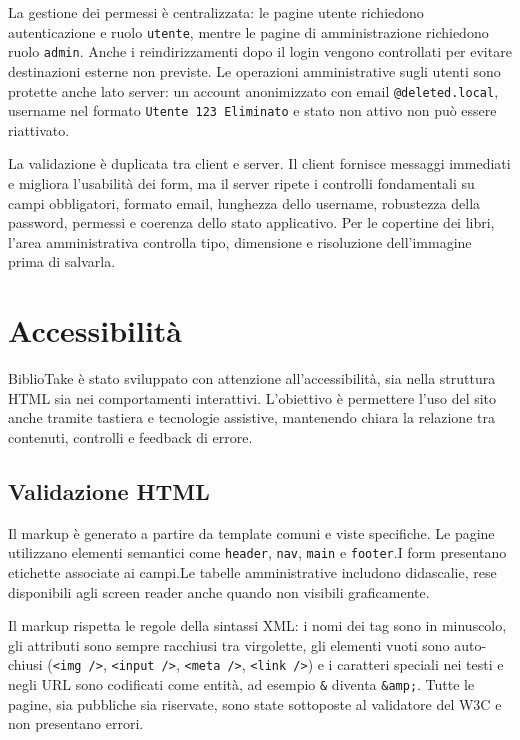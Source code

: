﻿\documentclass{article}
\newcommand{\nomeprogetto}{BiblioTake}
\begin{document}
La gestione dei permessi è centralizzata: le pagine utente richiedono autenticazione e ruolo \texttt{utente}, mentre le pagine di amministrazione richiedono ruolo \texttt{admin}. Anche i reindirizzamenti dopo il login vengono controllati per evitare destinazioni esterne non previste. Le operazioni amministrative sugli utenti sono protette anche lato server: un account anonimizzato con email \texttt{@deleted.local}, username nel formato \texttt{Utente 123 Eliminato} e stato non attivo non può essere riattivato.

La validazione è duplicata tra client e server. Il client fornisce messaggi immediati e migliora l'usabilità dei form, ma il server ripete i controlli fondamentali su campi obbligatori, formato email, lunghezza dello username, robustezza della password, permessi e coerenza dello stato applicativo. Per le copertine dei libri, l'area amministrativa controlla tipo, dimensione e risoluzione dell'immagine prima di salvarla.

\newpage

\section{Accessibilità}
\nomeprogetto{} è stato sviluppato con attenzione all'accessibilità, sia nella struttura HTML sia nei comportamenti interattivi. L'obiettivo è permettere l'uso del sito anche tramite tastiera e tecnologie assistive, mantenendo chiara la relazione tra contenuti, controlli e feedback di errore.

\subsection{Validazione HTML}
Il markup è generato a partire da template comuni e viste specifiche. Le pagine utilizzano elementi semantici come \texttt{header}, \texttt{nav}, \texttt{main} e \texttt{footer}.I form presentano etichette associate ai campi.Le tabelle amministrative includono didascalie, rese disponibili agli screen reader anche quando non visibili graficamente.

Il markup rispetta le regole della sintassi XML: i nomi dei tag sono in minuscolo, gli attributi sono sempre racchiusi tra virgolette, gli elementi vuoti sono auto-chiusi (\texttt{<img />}, \texttt{<input />}, \texttt{<meta />}, \texttt{<link />}) e i caratteri speciali nei testi e negli URL sono codificati come entità, ad esempio \texttt{\&} diventa \texttt{\&amp;}. Tutte le pagine, sia pubbliche sia riservate, sono state sottoposte al validatore del W3C e non presentano errori.
\end{document}
